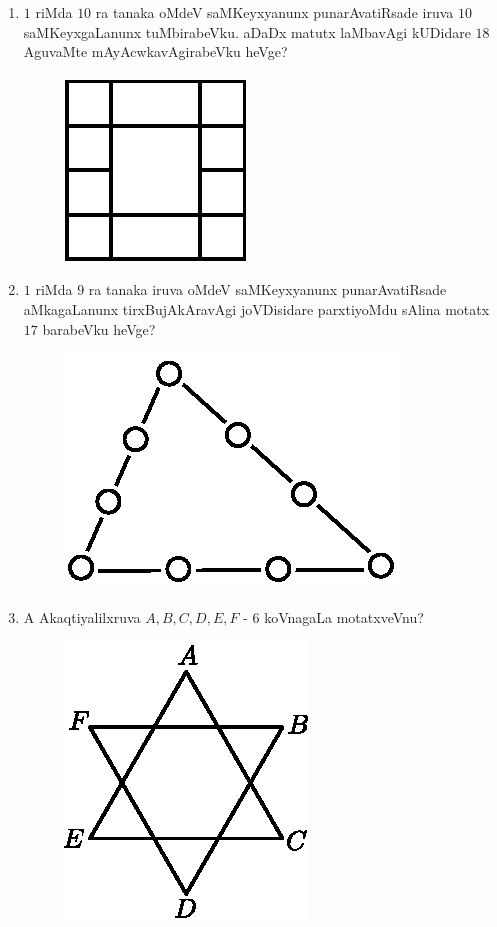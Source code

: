 \begin{enumerate}
\item $1$ riMda $10$ ra tanaka oMdeV saMKeyxyanunx punarAvatiRsade iruva $10$ saMKeyxgaLanunx tuMbirabeVku. aDaDx matutx laMbavAgi kUDidare $18$ AguvaMte mAyAcwkavAgirabeVku heVge?
\begin{figure}[H]
\centering
\includegraphics{src/figures/exr13.eps}
\end{figure}

\item $1$ riMda $9$ ra tanaka iruva oMdeV saMKeyxyanunx punarAvatiRsade aMkagaLanunx tirxBujAkAravAgi joVDisidare parxtiyoMdu sAlina motatx $17$ barabeVku heVge?
\begin{figure}[H]
\centering
\includegraphics{src/figures/exr14.eps}
\end{figure}

\eject

\item A Akaqtiyalilxruva $A,B,C,D,E,F$ - $6$ koVnagaLa motatxveVnu?
\begin{figure}[H]
\centering
\includegraphics{src/figures/exr15.eps}
\end{figure}


\end{enumerate}
